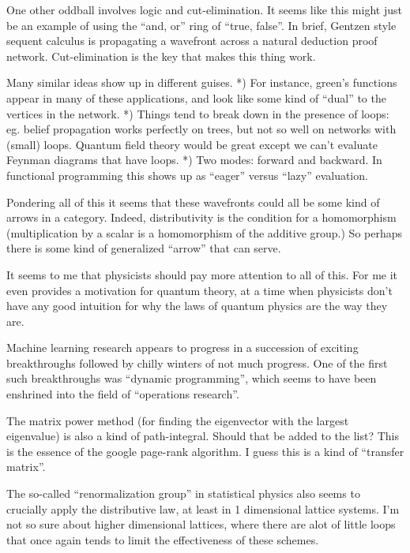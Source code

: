 \documentclass[11pt]{article}
\begin{document}
One other oddball involves logic and cut-elimination.
It seems like this might just be an example of using
the ``and, or'' ring of ``true, false''. In brief, Gentzen
style sequent calculus is propagating a wavefront across
a natural deduction proof network. Cut-elimination is
the key that makes this thing work.

Many similar ideas show up in different guises.
*) For instance, green's functions appear in many of these applications,
and look like some kind of ``dual'' to the vertices in the network.
*) Things tend to break down in the presence of loops: eg. 
belief propagation works perfectly on trees, but not so well on
networks with (small) loops. Quantum field theory would be
great except we can't evaluate Feynman diagrams that have
loops.
*) Two modes: forward and backward. In functional programming
this shows up as ``eager'' versus ``lazy'' evaluation.

Pondering all of this it seems that these wavefronts could
all be some kind of arrows in a category. Indeed, distributivity
is the condition for a homomorphism (multiplication by a scalar
is a homomorphism of the additive group.) So perhaps there
is some kind of generalized ``arrow'' that can serve.


It seems to me that physicists should pay more attention to
all of this. For me it even provides a motivation for quantum theory,
at a time when physicists don't have any good intuition
for why the laws of quantum physics are the way they are.

Machine learning research appears to progress in a succession of
exciting breakthroughs followed by chilly winters of not much progress.
One of the first such breakthroughs was ``dynamic programming'', which
seems to have been enshrined into the field of ``operations research''.

The matrix power method (for finding the eigenvector with the largest eigenvalue)
is also a kind of path-integral. Should that be added to the list? This is
the essence of the google page-rank algorithm. I guess this is a kind of
``transfer matrix''.

The so-called ``renormalization group'' in statistical physics also seems to
crucially apply the distributive law, at least in 1 dimensional lattice systems. I'm not
so sure about higher dimensional lattices, where there are alot of little loops
that once again tends to limit the effectiveness of these schemes. 
\end{document}
